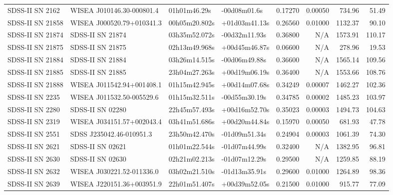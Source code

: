 \begin{longtable}{llllrrrr}
SDSS-II SN 2162  &       WISEA J010146.30-000801.4 &    01h01m46.29s &    -00d08m01.6s &  0.17270 &  0.00050 &   734.96 &       51.49 \\
SDSS-II SN 21858 &       WISEA J000520.79+010341.3 &   00h05m20.802s &   +01d03m41.13s &  0.26560 &  0.01000 &  1132.37 &       90.10 \\
SDSS-II SN 21874 &                SDSS-II SN 21874 &   03h35m52.072s &   -00d32m11.93s &  0.36800 &      N/A &  1573.91 &      110.17 \\
SDSS-II SN 21875 &                SDSS-II SN 21875 &   02h13m49.968s &   +00d45m46.87s &  0.06600 &      N/A &   278.96 &       19.53 \\
SDSS-II SN 21884 &                SDSS-II SN 21884 &   03h26m14.515s &   -00d06m49.88s &  0.36600 &      N/A &  1565.14 &      109.56 \\
SDSS-II SN 21885 &                SDSS-II SN 21885 &   23h04m27.263s &   +00d19m06.19s &  0.36400 &      N/A &  1553.66 &      108.76 \\
SDSS-II SN 21888 &       WISEA J011542.94+001408.1 &   01h15m42.945s &   +00d14m07.68s &  0.34249 &  0.00007 &  1462.27 &      102.36 \\
SDSS-II SN 2235  &       WISEA J011532.50-005529.6 &   01h15m32.511s &   -00d55m30.19s &  0.34785 &  0.00002 &  1485.23 &      103.97 \\
SDSS-II SN 2280  &                SDSS-II SN 02280 &   22h45m57.493s &   +00d16m52.70s &  0.35023 &  0.00003 &  1494.73 &      104.63 \\
SDSS-II SN 2319  &       WISEA J034151.57+002043.4 &   03h41m51.686s &   +00d20m44.84s &  0.15970 &  0.00050 &   681.93 &       47.78 \\
SDSS-II SN 2551  &        SDSS J235042.46-010951.3 &   23h50m42.470s &   -01d09m51.34s &  0.24904 &  0.00003 &  1061.39 &       74.30 \\
SDSS-II SN 2621  &                SDSS-II SN 02621 &   01h01m22.544s &   -01d07m44.99s &  0.32400 &      N/A &  1382.95 &       96.81 \\
SDSS-II SN 2630  &                SDSS-II SN 02630 &   02h21m02.213s &   -01d07m12.29s &  0.29500 &      N/A &  1259.85 &       88.19 \\
SDSS-II SN 2632  &       WISEA J030221.52-011336.0 &   03h02m21.510s &   -01d13m35.91s &  0.29600 &  0.01000 &  1264.89 &       98.36 \\
SDSS-II SN 2639  &       WISEA J220151.36+003951.9 &   22h01m51.407s &   +00d39m52.05s &  0.21500 &  0.01000 &   915.77 &       77.09 \\

\end{longtable}

